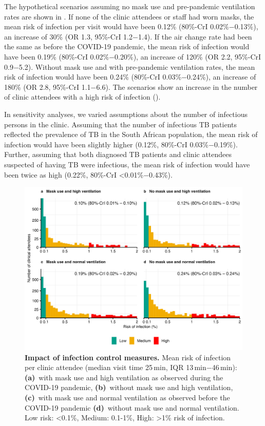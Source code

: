 \documentclass[fleqn,11pt]{wlscirep}
\begin{document}
The hypothetical scenarios assuming no mask use and pre-pandemic ventilation rates are shown in  . If none of the clinic attendees or staff had worn masks, the mean risk of infection per visit would have been 0.12\% (80\%-CrI 0.02\%$-$0.13\%), an increase of 30\% (OR 1.3, 95\%-CrI 1.2$-$1.4). If the air change rate had been the same as before the COVID-19 pandemic, the mean risk of infection would have been 0.19\% (80\%-CrI 0.02\%$-$0.20\%), an increase of 120\% (OR 2.2, 95\%-CrI 0.9$-$5.2). Without mask use and with pre-pandemic ventilation rates, the mean risk of infection would have been 0.24\% (80\%-CrI 0.03\%$-$0.24\%), an increase of 180\% (OR 2.8, 95\%-CrI 1.1$-$6.6). The scenarios show an increase in the number of clinic attendees with a high risk of infection (). 

In sensitivity analyses, we varied assumptions about the number of infectious persons in the clinic. Assuming that the number of infectious TB patients reflected the prevalence of TB in the South African population, the mean risk of infection would have been slightly higher (0.12\%, 80\%-CrI 0.03\%$-$0.19\%). Further, assuming that both diagnosed TB patients and clinic attendees suspected of having TB were infectious, the mean risk of infection would have been twice as high (0.22\%, 80\%-CrI <0.01\%$-$0.43\%).  

\begin{figure}
    \centering
    \includegraphics{results/modeling/mean-roi-comparison.png}
    \caption{\textbf{Impact of infection control measures.} Mean risk of infection per clinic attendee (median visit time 25\,min, IQR 13\,min$-$46\,min): \textbf{(a)}~with mask use and high ventilation as observed during the COVID-19 pandemic, \textbf{(b)}~without mask use and high ventilation, \textbf{(c)}~with mask use and normal ventilation as observed before the COVID-19 pandemic  \textbf{(d)}~without mask use and normal ventilation. Low risk: <0.1\%, Medium: 0.1-1\%, High: >1\% risk of infection.}
    \label{fig:scenario-results}
\end{figure}
\end{document}

